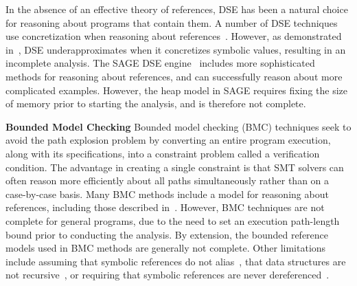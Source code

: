 In the absence of an effective theory of references, DSE has been a natural choice for reasoning about programs that contain them. A number of DSE techniques use concretization when reasoning about references~\cite{Godefroid:2005,Sen:2005,Godefroid:POPL07,Tillmann:2008}. However, as demonstrated in~\cite{Elkarablieh:2009}, DSE underapproximates when it concretizes symbolic values, resulting in an incomplete analysis. The SAGE DSE engine~\cite{Elkarablieh:2009} includes more sophisticated methods for reasoning about references, and can successfully reason about more complicated examples. However, the heap model in SAGE requires fixing the size of memory prior to starting the analysis, and is therefore not complete. 

\noindent\textbf{Bounded Model Checking}
Bounded model checking (BMC) techniques seek to avoid the path explosion problem by converting an entire program execution, along with its specifications, into a constraint problem called a verification condition. The advantage in creating a single constraint is that SMT solvers can often reason more efficiently about all paths simultaneously rather than on a case-by-case basis. Many BMC methods include a model for reasoning about references, including those described in~\cite{Clarke:2004,Barnett:2006,Xie:2005,Babic:2007,Dillig:2011}. However, BMC techniques are not complete for general programs, due to the need to set an execution path-length bound prior to conducting the analysis. By extension, the bounded reference models used in BMC methods are generally not complete. Other limitations include assuming that symbolic references do not alias~\cite{Xie:2005,Babic:2007}, that data structures are not recursive~\cite{Dillig:2011}, or requiring that symbolic references are never dereferenced~\cite{Clarke:2004}.

